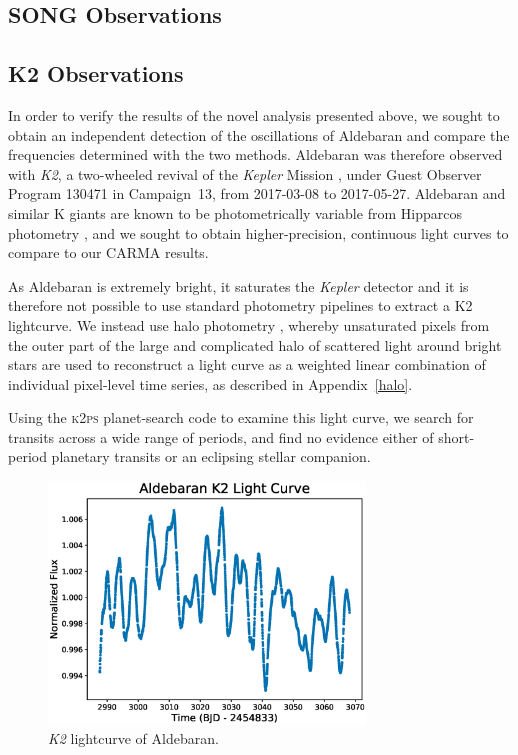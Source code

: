 \documentclass[modern]{aastex61}
\newcommand{\kepler}{\emph{Kepler}\xspace}
\newcommand{\ktwo}{\emph{K2}\xspace}
\begin{document}
\subsection{SONG Observations}

\subsection{K2 Observations}

In order to verify the results of the novel analysis presented above, we sought to obtain an independent detection of the oscillations of Aldebaran and compare the frequencies determined with the two methods. 
Aldebaran was therefore observed with \ktwo \citep{howell14}, a two-wheeled revival of the \kepler Mission \citep{2010sci...327..977b}, under Guest Observer Program 130471 in Campaign~13, from 2017-03-08 to 2017-05-27. Aldebaran and similar K giants are known to be photometrically variable from Hipparcos photometry \citep{bedding2000}, and we sought to obtain higher-precision, continuous light curves to compare to our CARMA results.

As Aldebaran is extremely bright, it saturates the \kepler detector and it is therefore not possible to use standard photometry pipelines to extract a K2 lightcurve. We instead use halo photometry \citep[as originally implemented in][]{White2017}, whereby unsaturated pixels from the outer part of the large and complicated halo of scattered light around bright stars are used to reconstruct a light curve as a weighted linear combination of individual pixel-level time series, as described in Appendix~\ref{halo}. 

Using the \textsc{k2ps} planet-search code \citep{k2ps,Pope2016} to examine this light curve, we search for transits across a wide range of periods, and find no evidence either of short-period planetary transits or an eclipsing stellar companion.

\begin{figure}
\centering
\includegraphics[width=0.75\textwidth]{aldebaran_lc.eps}
\caption{\ktwo lightcurve of Aldebaran.}
\label{k2_lightcurve}
\end{figure}
\end{document}
